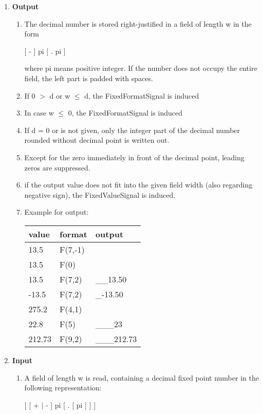 \begin{enumerate}
\item {\bf Output}
\begin{enumerate}
\item The decimal number is stored right-justified in a field of length
w in the form

[ - ] pi [ . pi ]

where pi means positive integer. If the number does not occupy the
entire field, the left part is padded with spaces.
\item If 0 $>$ d or w $\leq$ d, the FixedFormatSignal is induced
\item In case w $\leq$ 0, the FixedFormatSignal is induced
\item If d = 0 or is not given, only the integer part of the decimal
number rounded without decimal point is written out.
\item Except for the zero immediately in front of the decimal point,
leading zeros are suppressed.
\item if the output value does not fit into the given field width 
   (also regarding
 negative sign), the FixedValueSignal is induced.
\item Example for output:

\begin{tabular}{lll}
value  & format   & output \\ \hline
13.5   & F(7,-1)   &  \x \x {\em FixedFormatSignal!}  \\
13.5   & F(0)   &  \x \x {\em FixedFormatSignal!}  \\
13.5   & F(7,2)   & \_\_13.50  \\
-13.5   & F(7,2)   & \_-13.50  \\
275.2  & F(4,1)   &  \x \x {\em FixedValueSignal!} \\
22.8   & F(5)     & \_\_\_23 \\
212.73 & F(9,2)   & \_\_\_212.73 \\
\end{tabular}
\end{enumerate}
\item {\bf Input}
\begin{enumerate}
\item A field of length w is read, containing a decimal fixed point
number in the following representation:

[ [ + $\mid$ - ] pi [ . [ pi ] ] ]


\end{enumerate}
\end{enumerate}
